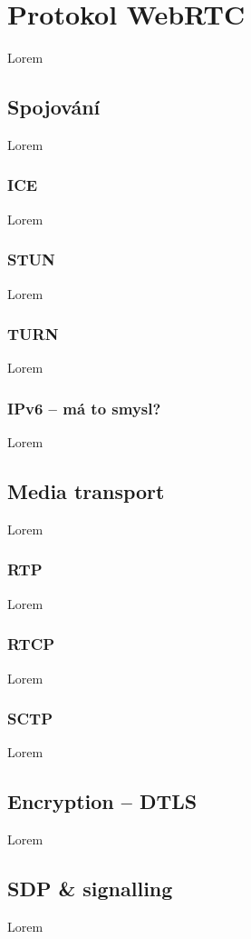 \section{Protokol WebRTC}\label{webRTC}

Lorem

\subsection{Spojování}

Lorem

\subsubsection{ICE}

Lorem

\subsubsection{STUN}

Lorem

\subsubsection{TURN}

Lorem

\subsubsection{IPv6 -- má to smysl?}

Lorem

\subsection{Media transport}

Lorem

\subsubsection{RTP}

Lorem

\subsubsection{RTCP}

Lorem

\subsubsection{SCTP}

Lorem

\subsection{Encryption -- DTLS}

Lorem

\subsection{SDP \& signalling}

Lorem
